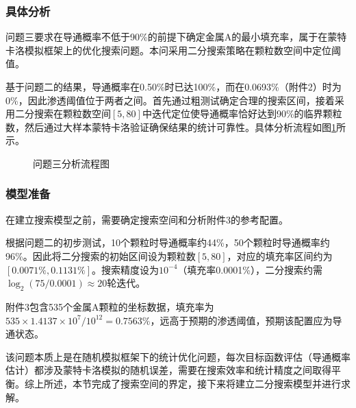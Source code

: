 
\subsubsection{具体分析}

问题三要求在导通概率不低于90\%的前提下确定金属A的最小填充率，属于在蒙特卡洛模拟框架上的优化搜索问题。本问采用二分搜索策略在颗粒数空间中定位阈值。

基于问题二的结果，导通概率在0.50\%时已达100\%，而在0.0693\%（附件2）时为0\%，因此渗透阈值位于两者之间。首先通过粗测试确定合理的搜索区间，接着采用二分搜索在颗粒数空间$[5, 80]$中迭代定位使导通概率恰好达到90\%的临界颗粒数，然后通过大样本蒙特卡洛验证确保结果的统计可靠性。具体分析流程如图\ref{fig:analysis3_flow}所示。

\begin{figure}[ht]
  \begin{center}
    \caption{问题三分析流程图}
    \label{fig:analysis3_flow}
  \end{center}
\end{figure}

\subsubsection{模型准备}

在建立搜索模型之前，需要确定搜索空间和分析附件3的参考配置。

根据问题二的初步测试，10个颗粒时导通概率约44\%，50个颗粒时导通概率约96\%。因此将二分搜索的初始区间设为颗粒数$[5, 80]$，对应的填充率区间约为$[0.0071\%, 0.1131\%]$。搜索精度设为$10^{-4}$（填充率0.0001\%），二分搜索约需$\log_2(75/0.0001) \approx 20$轮迭代。

附件3包含535个金属A颗粒的坐标数据，填充率为$535 \times 1.4137 \times 10^7 / 10^{12} = 0.7563\%$，远高于预期的渗透阈值，预期该配置应为导通状态。

该问题本质上是在随机模拟框架下的统计优化问题，每次目标函数评估（导通概率估计）都涉及蒙特卡洛模拟的随机误差，需要在搜索效率和统计精度之间取得平衡。综上所述，本节完成了搜索空间的界定，接下来将建立二分搜索模型并进行求解。
